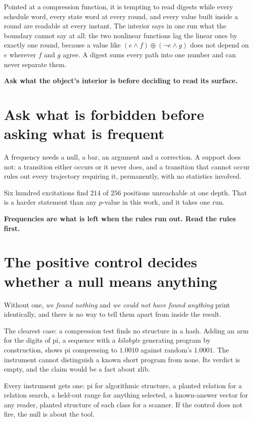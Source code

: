 Pointed at a compression function, it is tempting to read digests while every schedule word, every state word at every round, and every value built inside a round are readable at every instant. The interior says in one run what the boundary cannot say at all: the two nonlinear functions lag the linear ones by exactly one round, because a value like \((e \wedge f) \oplus (\neg e \wedge g)\) does not depend on \(e\) wherever \(f\) and \(g\) agree. A digest sums every path into one number and can never separate them.

\textbf{Ask what the object's interior is before deciding to read its surface.}

\section{Ask what is forbidden before asking what is frequent}

A frequency needs a null, a bar, an argument and a correction. A support does not: a transition either occurs or it never does, and a transition that cannot occur rules out every trajectory requiring it, permanently, with no statistics involved.

Six hundred excitations find \(214\) of \(256\) positions unreachable at one depth. That is a harder statement than any \(p\)-value in this work, and it takes one run.

\textbf{Frequencies are what is left when the rules run out. Read the rules first.}

\section{The positive control decides whether a null means anything}

Without one, \emph{we found nothing} and \emph{we could not have found anything} print identically, and there is no way to tell them apart from inside the result.

The clearest case: a compression test finds no structure in a hash. Adding an arm for the digits of pi, a sequence with a \emph{kilobyte} generating program by construction, shows pi compressing to \(1.0010\) against random's \(1.0001\). The instrument cannot distinguish a known short program from none. Its verdict is empty, and the claim would be a fact about zlib.

Every instrument gets one: pi for algorithmic structure, a planted relation for a relation search, a held-out range for anything selected, a known-answer vector for any reader, planted structure of each class for a scanner. If the control does not fire, the null is about the tool.

